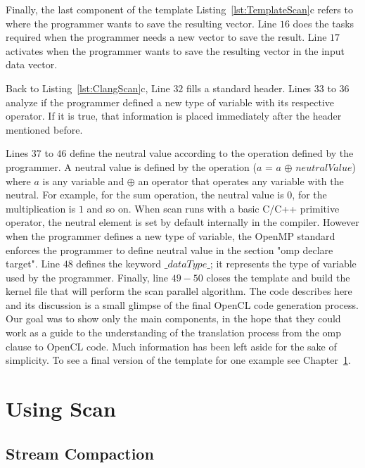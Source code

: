 \documentclass[Ingles]{ic-tese-v1}
\newcommand{\rcap}[1]{Chapter~\ref{cap:#1}}
\newcommand{\rlst}[1]{Listing~\ref{lst:#1}}
\begin{document}
Finally, the last component of the template \rlst{TemplateScan}{c} refers to
where the programmer wants to save the resulting vector. Line $16$ does the  tasks
required  when the programmer needs a new vector to save the result. Line $17$ activates when
the programmer wants to save the resulting vector in the input data vector.

Back to \rlst{ClangScan}{c}, Line $32$ fills a standard header. Lines $33$
to $36$ analyze if the programmer defined a new type of variable with its
respective operator. If it is true, that information is placed immediately after
the header mentioned before.

Lines $37$ to $46$ define the neutral value according to the operation defined
by the programmer.  A neutral value is defined by the operation ($a$ = $a$
$\oplus$ $neutralValue$) where $a$ is any variable and $\oplus$ an operator
that operates any variable with the neutral. For example, for the sum
operation, the neutral value is $0$, for the multiplication is $1$ and so on.
When scan runs  with a basic C/C++ primitive  operator, the neutral  element is
set by default internally in the compiler. However when the programmer defines
a new type of variable, the OpenMP standard enforces the programmer  to define
neutral value in the section "omp declare target".  Line $48$ defines the
keyword $\_dataType\_$; it represents the type of variable used by the
programmer. Finally, line $49-50$ closes the template and build the kernel file
that will perform the scan parallel algorithm. The code describes here and its
discussion is a small glimpse of the final OpenCL code generation process. Our
goal was to show only the main components, in the hope that they could work
as a guide to the understanding of the translation process from the omp clause
to OpenCL code. Much information has been left aside for the sake of
simplicity.
To see a final version of the template for one example see \rcap{ScanUse}.

\chapter{Using Scan}
\label{cap:ScanUse}

\section{Stream Compaction}
\end{document}
